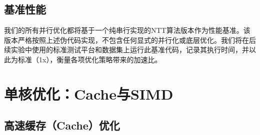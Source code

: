 \documentclass[a4paper]{article}
\begin{document}
\subsection{基准性能}
我们的所有并行优化都将基于一个纯串行实现的NTT算法版本作为性能基准。该版本严格按照上述伪代码实现，不包含任何显式的并行化或底层优化。我们将在后续实验中使用的标准测试平台和数据集上运行此基准代码，记录其执行时间，并以此为标准（1x），衡量各项优化策略带来的加速比。

\section{单核优化：Cache与SIMD}

\subsection{高速缓存（Cache）优化}
\end{document}
